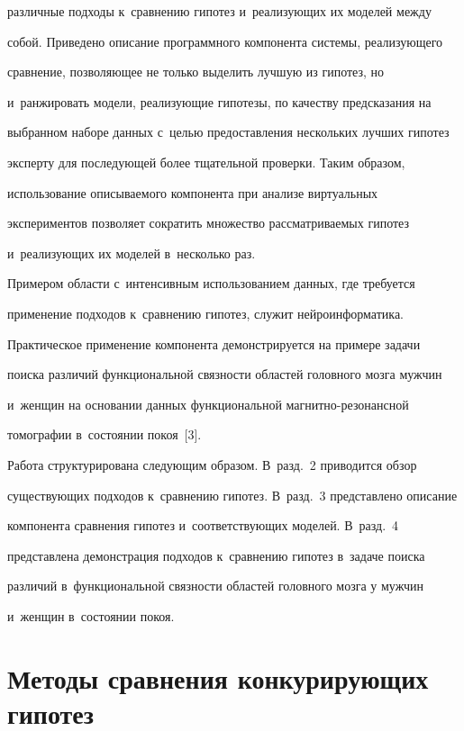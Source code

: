 различные подходы к~сравнению гипотез и~реализующих их моделей между 

собой. Приведено описание про\-грам\-мно\-го компонента системы, реализующего 

сравнение, позволяющее не только выделить лучшую из гипотез, но 

и~ранжировать модели, реализующие гипотезы, по качеству предсказания на 

выбранном наборе данных с~целью предоставления нескольких лучших гипотез 

эксперту для последующей более тщательной проверки. Таким образом, 

использование описываемого компонента при анализе виртуальных 

экспериментов позволяет сократить множество рассматриваемых гипотез 

и~реализующих их моделей в~несколько раз. 

      

      Примером области с~интенсивным использованием данных, где требуется 

применение подходов к~сравнению гипотез, служит нейроинформатика. 

Практическое применение компонента демонстрируется на примере задачи 

поиска различий функциональной связности областей головного мозга мужчин 

и~женщин на основании данных функциональной магнитно-резонансной 

томографии в~состоянии покоя~[3]. 

      

     Работа структурирована следующим образом. В~разд.~2 приводится обзор 

существующих подходов к~сравнению гипотез. В~разд.~3 представлено описание 

компонента сравнения гипотез и~соответствующих моделей. В~разд.~4 

пред\-став\-ле\-на демонстрация подходов к~сравнению гипотез в~задаче поиска 

различий в~функциональной связности областей головного мозга у мужчин 

и~женщин в~состоянии покоя. 

     

\section{Методы сравнения конкурирующих гипотез}



